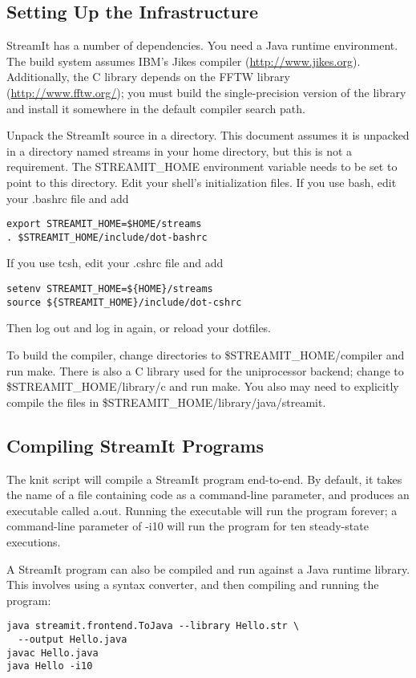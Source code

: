 \subsection{Setting Up the Infrastructure}

StreamIt has a number of dependencies.  You need a Java runtime
environment.  The build system assumes IBM's Jikes compiler
(\url{http://www.jikes.org}).  Additionally, the C library depends on
the FFTW library (\url{http://www.fftw.org/}); you must build the
single-precision version of the library and install it somewhere in
the default compiler search path.

Unpack the StreamIt source in a directory.  This document assumes it
is unpacked in a directory named \textsf{streams} in your home
directory, but this is not a requirement.  The \textsf{STREAMIT\_HOME}
environment variable needs to be set to point to this directory.  Edit
your shell's initialization files.  If you use \textsf{bash}, edit
your \textsf{.bashrc} file and add

\begin{verbatim}
export STREAMIT_HOME=$HOME/streams
. $STREAMIT_HOME/include/dot-bashrc
\end{verbatim}

If you use \textsf{tcsh}, edit your \textsf{.cshrc} file and add

\begin{verbatim}
setenv STREAMIT_HOME=${HOME}/streams
source ${STREAMIT_HOME}/include/dot-cshrc
\end{verbatim}

Then log out and log in again, or reload your dotfiles.

To build the compiler, change directories to
\textsf{\$STREAMIT\_HOME\slash{}com\-pi\-ler} and run \textsf{make}.
There is also a C library used for the uniprocessor backend; change to
\textsf{\$STREAMIT\_HOME\slash{}library\slash{}c} and run
\textsf{make}.  You also may need to explicitly compile the files in
\textsf{\$STREAMIT\_HOME\slash{}library\slash{}java\slash{}streamit}.

\subsection{Compiling StreamIt Programs}

The \textsf{knit} script will compile a StreamIt program end-to-end.
By default, it takes the name of a file containing code as a
command-line parameter, and produces an executable called
\textsf{a.out}.  Running the executable will run the program forever;
a command-line parameter of \textsf{-i10} will run the program for ten
steady-state executions.

A StreamIt program can also be compiled and run against a Java runtime
library.  This involves using a syntax converter, and then compiling
and running the program:

\begin{verbatim}
java streamit.frontend.ToJava --library Hello.str \
  --output Hello.java
javac Hello.java
java Hello -i10
\end{verbatim}

